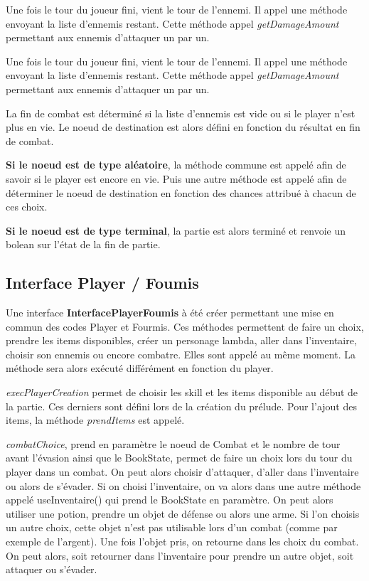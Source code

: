 		Une fois le tour du joueur fini, vient le tour de l'ennemi. Il appel une méthode envoyant la liste d'ennemis restant. Cette méthode appel \textit{getDamageAmount} permettant aux ennemis d'attaquer un par un.

		Une fois le tour du joueur fini, vient le tour de l'ennemi. Il appel une méthode envoyant la liste d'ennemis restant. Cette méthode appel \textit{getDamageAmount} permettant aux ennemis d'attaquer un par un.

		La fin de combat est déterminé si la liste d'ennemis est vide ou si le player n'est plus en vie. Le noeud de destination est alors défini en fonction du résultat en fin de combat.

		\textbf{Si le noeud est de type aléatoire}, la méthode commune est appelé afin de savoir si le player est encore en vie. Puis une autre méthode est appelé afin de déterminer le noeud de destination en fonction des chances attribué à chacun de ces choix.

		\textbf{Si le noeud est de type terminal}, la partie est alors terminé et renvoie un bolean sur l'état de la fin de partie.

	\subsection{Interface Player / Foumis}
		Une interface \textbf{InterfacePlayerFoumis} à été créer permettant une mise en commun des codes Player et Fourmis. Ces méthodes permettent de faire un choix, prendre les items disponibles, créer un personage lambda, aller dans l'inventaire, choisir son ennemis ou encore combatre. Elles sont appelé au même moment. La méthode sera alors exécuté différément en fonction du player.

		\textit{execPlayerCreation} permet de choisir les skill et les items disponible au début de la partie. Ces derniers sont défini lors de la création du prélude. Pour l'ajout des items, la méthode \textit{prendItems} est appelé.

		\textit{combatChoice}, prend en paramètre le noeud de Combat et le nombre de tour avant l'évasion ainsi que le BookState, permet de faire un choix lors du tour du player dans un combat. On peut alors choisir d'attaquer, d'aller dans l'inventaire ou alors de s'évader. Si on choisi l'inventaire, on va alors dans une autre méthode appelé useInventaire() qui prend le BookState en paramètre. On peut alors utiliser une potion, prendre un objet de défense ou alors une arme. Si l'on choisis un autre choix, cette objet n'est pas utilisable lors d'un combat (comme par exemple de l'argent). Une fois l'objet pris, on retourne dans les choix du combat. On peut alors, soit retourner dans l'inventaire pour prendre un autre objet, soit attaquer ou s'évader.


